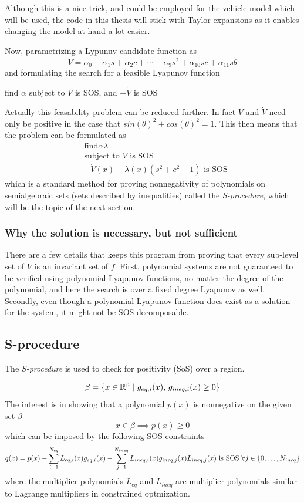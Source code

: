 Although this is a nice trick, and could be employed for the vehicle model which
will be used, the code in this thesis will stick with Taylor expansions as it
enables changing the model at hand a lot easier.

Now, parametrizing a Lypunuv candidate function as
\[
  V = \alpha_0 + \alpha_1s + \alpha_2c + \cdots + \alpha_9s^2 + \alpha_{10}sc +
  \alpha_{11}s\dot{\theta}
\]
and formulating the search for a feasible Lyapunov function
\begin{example}
  find \(\alpha\) subject to \(V\) is SOS, and \(-\dot{V}\) is SOS
\end{example}

Actually this feasability problem can be reduced further. In fact \(V\) and
\(\dot{V}\) need only be positive in the case that \(sin(\theta)^2 +
cos(\theta)^2 = 1\). This then means that the problem can be formulated as
\begin{align*}
  &\text{find}\alpha \lambda \\
  &\text{subject to } V \text{ is SOS} \\
  &-\dot{V}(x) - \lambda(x)\left( s^2 + c^2 -1 \right) \text{ is SOS}
\end{align*}
which is a standard method for proving nonnegativity of polynomials on
semialgebraic sets (sets described by inequalities) called the
\textit{S-procedure}, which will be the topic of the next section.

\subsubsection{Why the solution is necessary, but not sufficient}

There are a few details that keeps this program from proving that every
sub-level set of \(V\) is an invariant set of \(f\). First, polynomial systems
are not guaranteed to be verified using polynomial Lyapunov functions, no matter
the degree of the polynomial, and here the search is over a fixed degree
Lyapunov as well. Secondly, even though a polynomial Lyapunov function does
exist as a solution for the system, it might not be \ac{SOS} decomposable.

\subsection{S-procedure}

The \textit{S-procedure} is used to check for positivity (SoS) over a region.

\[
  \beta = \lbrace x \in \mathbb{R}^n \mid g_{eq,i}(x),\,g_{ineq,i}(x) \geq 0\rbrace
\]
The interest is in showing that a polynomial \(p(x)\) is nonnegative on the
given set \(\beta\)
\[
  x \in \beta \implies p(x) \geq 0
\]
which can be imposed by the following SOS constraints
\[
  q(x) = p(x) - \sum_{i=1}^{N_{eq}}L_{eq,i}(x)g_{eq,i}(x) -
  \sum_{j=1}^{N_{ineq}}L_{ineq,i}(x)g_{ineq,j}(x) \\
  L_{ineq,j}(x) \text{ is SOS } \forall j \in \lbrace0,\ldots,N_{ineq}\rbrace
\]
where the multiplier polynomials \(L_{eq}\) and \(L_{ineq}\) are multiplier
polynomials similar to Lagrange multipliers in constrained optmization.

